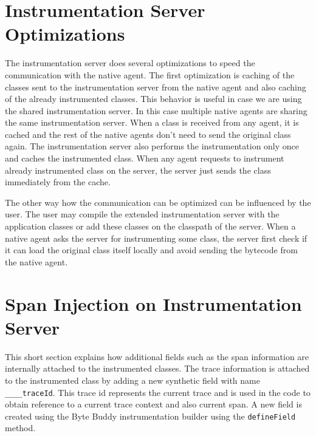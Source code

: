 \section{Instrumentation Server Optimizations}
The instrumentation server does several optimizations to speed the communication with the native agent. The first optimization is caching of the classes sent to the instrumentation server from the native agent and also caching of the already instrumented classes. This behavior is useful in case we are using the shared instrumentation server. In this case multiple native agents are sharing the same instrumentation server. When a class is received from any agent, it is cached and the rest of the native agents don't need to send the original class again. The instrumentation server also performs the instrumentation only once and caches the instrumented class. When any agent requests to instrument already instrumented class on the server, the server just sends the class immediately from the cache.

The other way how the communication can be optimized can be influenced by the user. The user may compile the extended instrumentation server with the application classes or add these classes on the classpath of the server. When a native agent asks the server for instrumenting some class, the server first check if it can load the original class itself locally and avoid sending the bytecode from the native agent. 
\section{Span Injection on Instrumentation Server}
This short section explains how additional fields such as the span information are internally attached to the instrumented classes. The trace information is attached to the instrumented class by adding a new synthetic field with name \texttt{\_\_\_\_traceId}. This trace id represents the current trace and is used in the code to obtain reference to a current trace context and also current span.  A new field is created using the Byte Buddy instrumentation builder using the \texttt{defineField} method.
